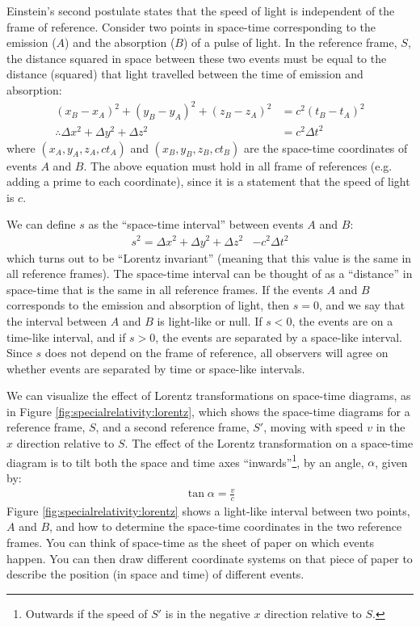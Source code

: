Einstein's second postulate states that the speed of light is independent of the frame of reference. Consider two points in space-time corresponding to the emission ($A$) and the absorption ($B$) of a pulse of light. In the reference frame, $S$, the distance squared in space between these two events must be equal to the distance (squared) that light travelled between the time of emission and absorption:
\begin{align*}
(x_B-x_A)^2+(y_B-y_A)^2+(z_B-z_A)^2&= c^2(t_B-t_A)^2\\
\therefore \Delta x^2 + \Delta y^2 +\Delta z^2&=c^2\Delta t^2
\end{align*}
where $(x_A,y_A,z_A,ct_A)$ and $(x_B,y_B,z_B,ct_B)$ are the space-time coordinates of events $A$ and $B$. The above equation must hold in all frame of references (e.g. adding a prime to each coordinate), since it is a statement that the speed of light is $c$.

We can define $s$ as the ``space-time interval'' between events $A$ and $B$:
\begin{align*}
s^2 = \Delta x^2 + \Delta y^2 +\Delta z^2&-c^2\Delta t^2
\end{align*}
which turns out to be ``Lorentz invariant'' (meaning that this value is the same in all reference frames). The space-time interval can be thought of as a ``distance'' in space-time that is the same in all reference frames. If the events $A$ and $B$ corresponds to the emission and absorption of light, then $s=0$, and we say that the interval between $A$ and $B$ is light-like or null. If $s<0$, the events are on a time-like interval, and if $s>0$, the events are separated by a space-like interval. Since $s$ does not depend on the frame of reference, all observers will agree on whether events are separated by time or space-like intervals.

We can visualize the effect of Lorentz transformations on space-time diagrams, as in Figure \ref{fig:specialrelativity:lorentz}, which shows the space-time diagrams for a reference frame, $S$, and a second reference frame, $S'$, moving with speed $v$ in the $x$ direction relative to $S$.
The effect of the Lorentz transformation on a space-time diagram is to tilt both the space and time axes ``inwards''\footnote{Outwards if the speed of $S'$ is in the negative $x$ direction relative to $S$.}, by an angle, $\alpha$, given by:
\begin{align*}
\tan\alpha = \frac{v}{c}
\end{align*}
Figure \ref{fig:specialrelativity:lorentz} shows a light-like interval between two points, $A$ and $B$, and how to determine the space-time coordinates in the two reference frames. You can think of space-time as the sheet of paper on which events happen. You can then draw different coordinate systems on that piece of paper to describe the position (in space and time) of different events.



